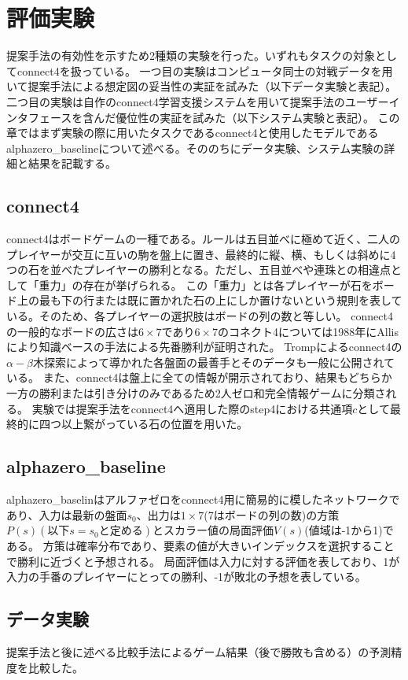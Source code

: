\chapter{評価実験}
提案手法の有効性を示すため2種類の実験を行った。いずれもタスクの対象としてconnect4を扱っている。
一つ目の実験はコンピュータ同士の対戦データを用いて提案手法による想定図の妥当性の実証を試みた（以下データ実験と表記）。
二つ目の実験は自作のconnect4学習支援システムを用いて提案手法のユーザーインタフェースを含んだ優位性の実証を試みた（以下システム実験と表記）。
この章ではまず実験の際に用いたタスクであるconnect4と使用したモデルであるalphazero\_baselineについて述べる。そののちにデータ実験、システム実験の詳細と結果を記載する。
\section{connect4\cite{connect4}}
connect4はボードゲームの一種である。ルールは五目並べに極めて近く、二人のプレイヤーが交互に互いの駒を盤上に置き、最終的に縦、横、もしくは斜めに4つの石を並べたプレイヤーの勝利となる。ただし、五目並べや連珠との相違点として「重力」の存在が挙げられる。
この「重力」とは各プレイヤーが石をボード上の最も下の行または既に置かれた石の上にしか置けないという規則を表している。そのため、各プレイヤーの選択肢はボードの列の数と等しい。
connect4の一般的なボードの広さは$6\times7$であり$6\times7$のコネクト4については1988年にAllis\cite{allis}により知識ベースの手法による先番勝利が証明された。
Tromp\cite{data}によるconnect4の$\alpha-\beta$木探索によって導かれた各盤面の最善手とそのデータも一般に公開されている。
また、connect4は盤上に全ての情報が開示されており、結果もどちらか一方の勝利または引き分けのみであるため2人ゼロ和完全情報ゲームに分類される。
実験では提案手法をconnect4へ適用した際のstep4における共通項$c$として最終的に四つ以上繋がっている石の位置を用いた。
\section{alphazero\_baseline\cite{baseline}}
alphazero\_baselinはアルファゼロをconnect4用に簡易的に模したネットワークであり、入力は最新の盤面$s_0$、出力は$1\times7$(7はボードの列の数)の方策$P(s)(以下s=s_0と定める)$とスカラー値の局面評価$V(s)$(値域は-1から1)である。
方策は確率分布であり、要素の値が大きいインデックスを選択することで勝利に近づくと予想される。
局面評価は入力に対する評価を表しており、1が入力の手番のプレイヤーにとっての勝利、-1が敗北の予想を表している。

\section{データ実験}
\label{chap:evaluation}
提案手法と後に述べる比較手法によるゲーム結果（後で勝敗も含める）の予測精度を比較した。
